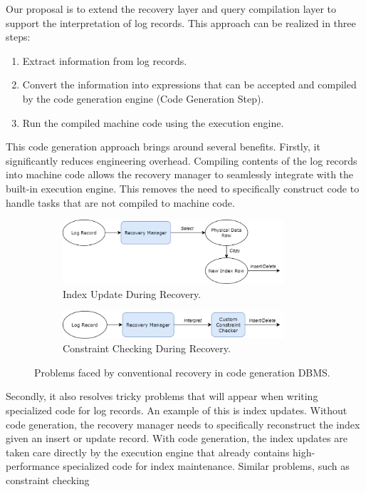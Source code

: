 \documentclass[12pt]{cmuthesis}
\begin{document}
Our proposal is to extend the recovery layer and query compilation layer to support the interpretation of log records. This approach can be realized in three steps:

\begin{enumerate}
\item Extract information from log records.
\item Convert the information into expressions that can be accepted and compiled by the code generation engine (Code Generation Step).
\item Run the compiled machine code using the execution engine.
\end{enumerate}

This code generation approach brings around several benefits. Firstly, it significantly reduces engineering overhead. Compiling contents of the log records into machine code allows the recovery manager to seamlessly integrate with the built-in execution engine. This removes the need to specifically construct code to handle tasks that are not compiled to machine code.

\begin{figure}[H]
\centering
\begin{subfigure}{.5\textwidth}
 \centering
 \includegraphics[width=0.9\textwidth]{images/RecoverIndex.png}
 \caption{Index Update During Recovery.}
  \label{fig:pipeline_graph}
\end{subfigure}%
\begin{subfigure}{.5\textwidth}
 \centering
 \includegraphics[width=0.9\textwidth]{images/RecoverConstraint.png}
 \caption{Constraint Checking During Recovery.}
  \label{fig:pipeline_code}
\end{subfigure}
\caption{Problems faced by conventional recovery in code generation DBMS.}
\label{fig:log_record}
\end{figure}

Secondly, it also resolves tricky problems that will appear when writing specialized code for log records. An example of this is index updates. Without code generation, the recovery manager needs to specifically reconstruct the index given an insert or update record. With code generation, the index updates are taken care directly by the execution engine that already contains high-performance specialized code for index maintenance. Similar problems, such as constraint checking
\end{document}
